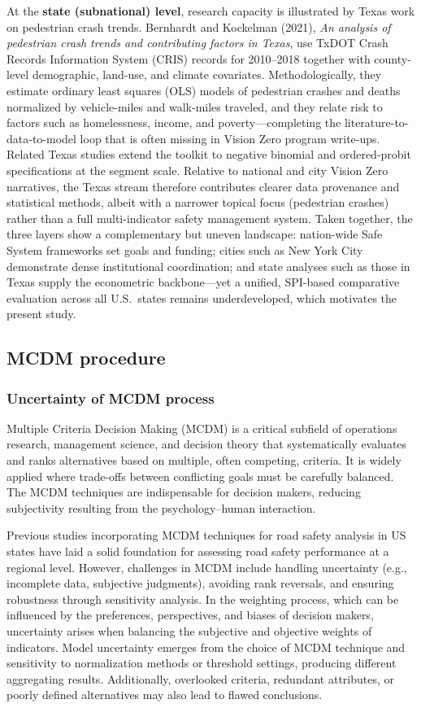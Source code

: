 \documentclass{article}
\begin{document}
At the \textbf{state (subnational) level}, research capacity is illustrated by Texas work on pedestrian crash trends. Bernhardt and Kockelman (2021), \textit{An analysis of pedestrian crash trends and contributing factors in Texas}, use TxDOT Crash Records Information System (CRIS) records for 2010--2018 together with county-level demographic, land-use, and climate covariates. Methodologically, they estimate ordinary least squares (OLS) models of pedestrian crashes and deaths normalized by vehicle-miles and walk-miles traveled, and they relate risk to factors such as homelessness, income, and poverty---completing the literature-to-data-to-model loop that is often missing in Vision Zero program write-ups. Related Texas studies extend the toolkit to negative binomial and ordered-probit specifications at the segment scale. Relative to national and city Vision Zero narratives, the Texas stream therefore contributes clearer data provenance and statistical methods, albeit with a narrower topical focus (pedestrian crashes) rather than a full multi-indicator safety management system. Taken together, the three layers show a complementary but uneven landscape: nation-wide Safe System frameworks set goals and funding; cities such as New York City demonstrate dense institutional coordination; and state analyses such as those in Texas supply the econometric backbone---yet a unified, SPI-based comparative evaluation across all U.S.\ states remains underdeveloped, which motivates the present study.

\subsection{MCDM procedure}

\subsubsection{Uncertainty of MCDM process}
Multiple Criteria Decision Making (MCDM) is a critical subfield of operations research, management science, and decision theory that systematically evaluates and ranks alternatives based on multiple, often competing, criteria. It is widely applied where trade-offs between conflicting goals must be carefully balanced. The MCDM techniques are indispensable for decision makers, reducing subjectivity resulting from the psychology--human interaction.

Previous studies incorporating MCDM techniques for road safety analysis in US states have laid a solid foundation for assessing road safety performance at a regional level. However, challenges in MCDM include handling uncertainty (e.g., incomplete data, subjective judgments), avoiding rank reversals, and ensuring robustness through sensitivity analysis. In the weighting process, which can be influenced by the preferences, perspectives, and biases of decision makers, uncertainty arises when balancing the subjective and objective weights of indicators. Model uncertainty emerges from the choice of MCDM technique and sensitivity to normalization methods or threshold settings, producing different aggregating results. Additionally, overlooked criteria, redundant attributes, or poorly defined alternatives may also lead to flawed conclusions.
\end{document}

